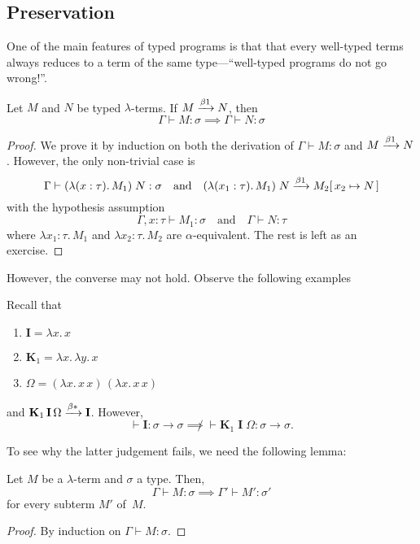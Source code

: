\subsection{Preservation}
One of the main features of typed programs is that that every well-typed terms
always reduces to a term of the same type---``well-typed programs do not go
wrong!''.
\begin{theorem}
  \label{thm:preservation}
  Let $M$ and $N$ be typed $\lambda$-terms. 
  If $M \xrightarrow{\beta1} N$, then
  \[
    \Gamma \vdash M : \sigma \implies \Gamma \vdash N : \sigma
  \]
\end{theorem}
\begin{proof}
  We prove it by induction on both the derivation of $\Gamma \vdash M :
  \sigma$ and $M \xrightarrow{\beta1} N$. However, the only non-trivial case is
  \[
    \Gamma \vdash (\lambda (x : \tau).\, M_1)\; N : \sigma
    \quad\text{and}\quad
    (\lambda (x_1 : \tau).\, M_1)\;N \xrightarrow{\beta1} M_2[\,x_2\mapsto N\,]
  \]
  with the hypothesis assumption
  \[
    \Gamma, x : \tau \vdash M_1 : \sigma
    \quad\text{and}\quad
    \Gamma \vdash N : \tau
  \]
  where $\lambda x_1:\tau.\,M_1$ and $\lambda x_2:\tau.\,M_2$ are
  $\alpha$-equivalent. The rest is left as an exercise.
\end{proof}
However, the converse may not hold. Observe the following examples
\begin{example}
  Recall that 
  \begin{enumerate}
    \item $\mathbf{I} = \lambda x.\, x$
    \item $\mathbf{K}_1 = \lambda x.\, \lambda y.\, x$
    \item $\Omega = (\lambda x.\, x\,x)\,(\lambda x.\, x\,x)$
  \end{enumerate}
  and $\mathbf{K}_1\,\mathbf{I}\,\Omega \xrightarrow{\beta*} \mathbf{I}$. However, 
  \[
    \vdash \mathbf{I} : \sigma \to \sigma
    \not\implies
    \vdash \mathbf{K}_1\;\mathbf{I}\;\Omega : \sigma \to \sigma.
  \]
\end{example}
To see why the latter judgement fails, we need the following lemma:
\begin{lemma}
  Let $M$ be a  $\lambda$-term and $\sigma$ a type. Then,  
  \[
    \Gamma \vdash M : \sigma 
    \implies \Gamma' \vdash M' : \sigma'
  \]
  for every subterm $M'$ of~$M$.
\end{lemma}
\begin{proof}
  By induction on $\Gamma \vdash M : \sigma$.
\end{proof}
